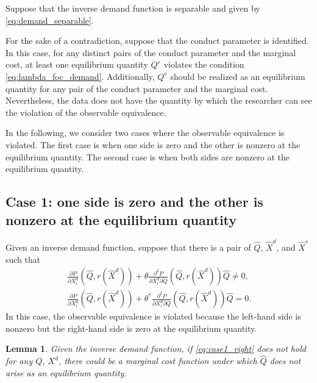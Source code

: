 \documentclass[11pt, a4paper]{article}
\newtheorem{lemma}{Lemma}
\theoremstyle{remark}
\begin{document}
Suppose that the inverse demand function is separable and given by \eqref{eq:demand_separable}.

For the sake of a contradiction, suppose that the conduct parameter is identified.
In this case, for any distinct pairs of the conduct parameter and the marginal cost, at least one equilibrium quantity $Q^e$ violates the condition \eqref{eq:lambda_foc_demand}.
Additionally, $Q^e$ should be realized as an equilibrium quantity for any pair of the conduct parameter and the marginal cost.
Nevertheless, the data does not have the quantity by which the researcher can see the violation of the observable equivalence.

In the following, we consider two cases where the observable equivalence is violated.
The first case is when one side is zero and the other is nonzero at the equilibrium quantity.
The second case is when both sides are nonzero at the equilibrium quantity.

\subsection{Case 1: one side is zero and the other is nonzero at the equilibrium quantity}
Given an inverse demand function, suppose that there is a pair of $\hat{Q}$, $\hat{X}^{d}$, and $\hat{X}^{s}$ such that 
\begin{align}
    \frac{\partial P}{\partial X^{d}_i}(\hat{Q}, r(\hat{X}^{d})) + \theta\frac{\partial^2 P}{\partial X^{d}_{i}\partial Q}(\hat{Q}, r(\hat{X}^{d}))\hat{Q}  \ne 0,\label{eq:case1_left}\\
    \frac{\partial P}{\partial X^{d}_i}(\hat{Q}, r(\hat{X}^{d})) + \theta^{*}\frac{\partial^2 P}{\partial X^{d}_{i}\partial Q}(\hat{Q}, r(\hat{X}^{d}))\hat{Q}  = 0.\label{eq:case1_right}
\end{align}
In this case, the observable equivalence is violated because the left-hand side is nonzero but the right-hand side is zero at the equilibrium quantity.


\begin{lemma}
    Given the inverse demand function, if \eqref{eq:case1_right} does not hold for any $Q$, $X^{d}$, there could be a marginal cost function under which $\hat{Q}$ does not arise as an equilibrium quantity.
\end{lemma}
\end{document}
